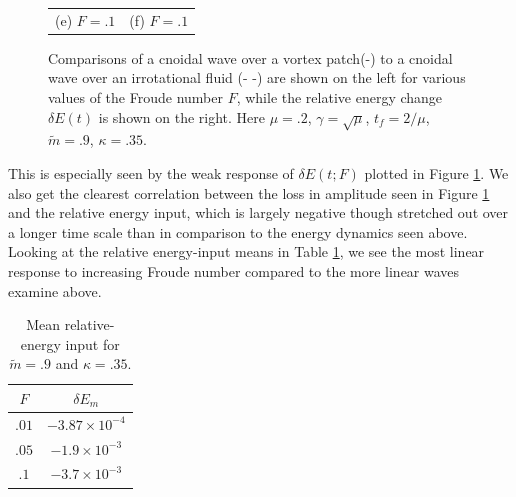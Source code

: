\documentclass[a4paper,11pt]{article}
\begin{document}
\begin{figure}
\begin{tabular}{cc}
(e)  $F=.1$ & (f)  $F=.1$
\end{tabular}
\caption{Comparisons of a cnoidal wave over a vortex patch(-) to a cnoidal wave over an irrotational fluid (- -) are shown on the left for various values of the Froude number $F$, while the relative energy change $\delta E(t)$ is shown on the right.  Here $\mu=.2$, $\gamma=\sqrt{\mu}$, $t_{f}=2/\mu$, $\tilde{m}=.9$, $\kappa = .35$.}
\label{fig:highsolwave}
\end{figure}
This is especially seen by the weak response of $\delta E(t;F)$ plotted in Figure \ref{fig:highsolwave}.  We also get the clearest correlation between the loss in amplitude seen in Figure \ref{fig:highsolwave} and the relative energy input, which is largely negative though stretched out over a longer time scale than in comparison to the energy dynamics seen above.  Looking at the relative energy-input means in Table \ref{tab:highsolmean}, we see the most linear response to increasing Froude number compared to the more linear waves examine above.  
\begin{table}
\centering
\begin{tabular}{c|c}
$F$ & $\delta E_{m}$ \\
\hline
$.01$ & $-3.87\times 10^{-4}$\\
$.05$ & $-1.9\times 10^{-3}$\\
$.1$ & $-3.7\times 10^{-3}$
\end{tabular}
\caption{Mean relative-energy input for $\tilde{m}=.9$ and $\kappa=.35$.}
\label{tab:highsolmean}
\end{table}
\end{document}
